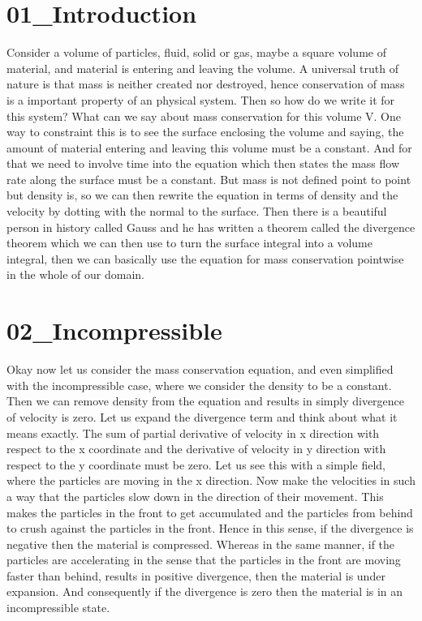 \documentclass{article}
\begin{document}
\section*{01\_Introduction}
Consider a volume of particles, fluid, solid or gas, maybe a square volume of material, and material is entering and leaving the volume. A universal truth of nature is that mass is neither created nor destroyed, hence conservation of mass is a important property of an physical system. Then so how do we write it for this system? What can we say about mass conservation for this volume V. One way to constraint this is to see the surface enclosing the volume and saying, the amount of material entering and leaving this volume must be a constant. And for that we need to involve time into the equation which then states the mass flow rate along the surface must be a constant. But mass is not defined point to point but density is, so we can then rewrite the equation in terms of density and the velocity by dotting with the normal to the surface. Then there is a beautiful person in history called Gauss and he has written a theorem called the divergence theorem which we can then use to turn the surface integral into a volume integral, then we can basically use the equation for mass conservation pointwise in the whole of our domain.

\section*{02\_Incompressible}
Okay now let us consider the mass conservation equation, and even simplified with the incompressible case, where we consider the density to be a constant. Then we can remove density from the equation and results in simply divergence of velocity is zero. Let us expand the divergence term and think about what it means exactly. The sum of partial derivative of velocity in x direction with respect to the x coordinate and the derivative of velocity in y direction with respect to the y coordinate must be zero. Let us see this with a simple field, where the particles are moving in the x direction. Now make the velocities in such a way that the particles slow down in the direction of their movement. This makes the particles in the front to get accumulated and the particles from behind to crush against the particles in the front. Hence in this sense, if the divergence is negative then the material is compressed. Whereas in the same manner, if the particles are accelerating in the sense that the particles in the front are moving faster than behind, results in positive divergence, then the material is under expansion. And consequently if the divergence is zero then the material is in an incompressible state.
\end{document}
